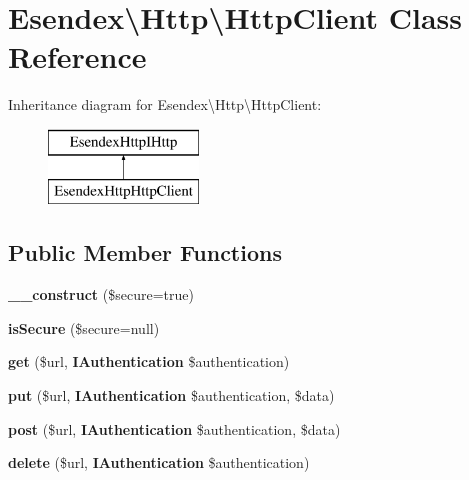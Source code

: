 \section{Esendex\textbackslash{}Http\textbackslash{}Http\-Client Class Reference}
\label{class_esendex_1_1_http_1_1_http_client}
Inheritance diagram for Esendex\textbackslash{}Http\textbackslash{}Http\-Client\-:\begin{figure}[H]
\begin{center}
\leavevmode
\includegraphics[height=2.000000cm]{class_esendex_1_1_http_1_1_http_client}
\end{center}
\end{figure}
\subsection*{Public Member Functions}
\begin{DoxyCompactItemize}
\item 
{\bfseries \-\_\-\-\_\-construct} (\$secure=true)\label{class_esendex_1_1_http_1_1_http_client_a04c1ff3ad9331fe48d40fad7a14ec9b2}

\item 
{\bfseries is\-Secure} (\$secure=null)\label{class_esendex_1_1_http_1_1_http_client_ac486ce82b0a75e9057ac69bf5b61a5b1}

\item 
{\bfseries get} (\$url, {\bf I\-Authentication} \$authentication)\label{class_esendex_1_1_http_1_1_http_client_a476c23a396bd9c915d458edba4abf886}

\item 
{\bfseries put} (\$url, {\bf I\-Authentication} \$authentication, \$data)\label{class_esendex_1_1_http_1_1_http_client_ad1a62808fd72cffc6d9060306891b605}

\item 
{\bfseries post} (\$url, {\bf I\-Authentication} \$authentication, \$data)\label{class_esendex_1_1_http_1_1_http_client_a5f37961c6324cd507dc5e79d338d6a66}

\item 
{\bfseries delete} (\$url, {\bf I\-Authentication} \$authentication)\label{class_esendex_1_1_http_1_1_http_client_a35656e60c01439250499101b15e61364}

\end{DoxyCompactItemize}
